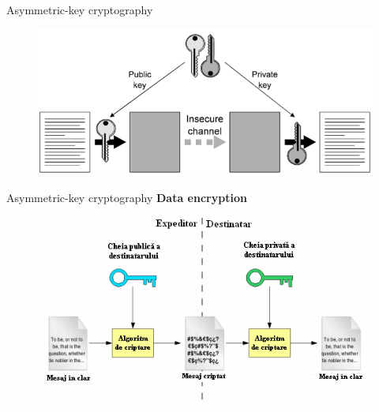 \documentclass[pdf]{beamer}
\begin{document}
\begin{frame}{Asymmetric-key cryptography}
\begin{figure}[t]
\centering
\includegraphics[scale=0.5]{Images/asymg}
\end{figure}
\end{frame}



\begin{frame}{Asymmetric-key cryptography}
\textbf{Data encryption}
\begin{figure}[t]
\centering
\includegraphics[scale=1]{Images/asyme}
\end{figure}
\end{frame}
\end{document}
